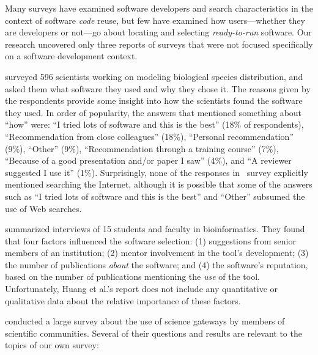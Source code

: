 \documentclass[review]{elsarticle}
\begin{document}
Many surveys have examined software developers and search characteristics in the context of software \emph{code} reuse, but few have examined how users---whether they are developers or not---go about locating and selecting \emph{ready-to-run} software.  Our research uncovered only three reports of surveys that were not focused specifically on a software development context.%

\citet{joppa2013troubling} surveyed 596 scientists working on modeling biological species distribution, and asked them what software they used and why they chose it.  The reasons given by the respondents provide some insight into how the scientists found the software they used.  In order of popularity, the answers that mentioned something about ``how'' were: ``I tried lots of software and this is the best'' (18\% of respondents), ``Recommendation from close colleagues'' (18\%), ``Personal recommendation'' (9\%), ``Other'' (9\%), ``Recommendation through a training course'' (7\%), ``Because of a good presentation and/or paper I saw'' (4\%), and ``A reviewer suggested I use it'' (1\%).  Surprisingly, none of the responses in~\citeauthor{joppa2013troubling} survey explicitly mentioned searching the Internet, although it is possible that some of the answers such as ``I tried lots of software and this is the best'' and ``Other'' subsumed the use of Web searches.

\citet{huang2013provenance} summarized interviews of 15 students and faculty in bioinformatics.  They found that four factors influenced the software selection: (1) suggestions from senior members of an institution; (2) mentor involvement in the tool's development; (3) the number of publications \emph{about} the software; and (4) the software's reputation, based on the number of publications mentioning the \emph{use} of the tool.  Unfortunately, Huang et al.'s report does not include any quantitative or qualitative data about the relative importance of these factors.

\citet{lawrence2015science, lawrence2014who} conducted a large survey about the use of science gateways by members of scientific communities.  Several of their questions and results are relevant to the topics of our own survey:
\end{document}
